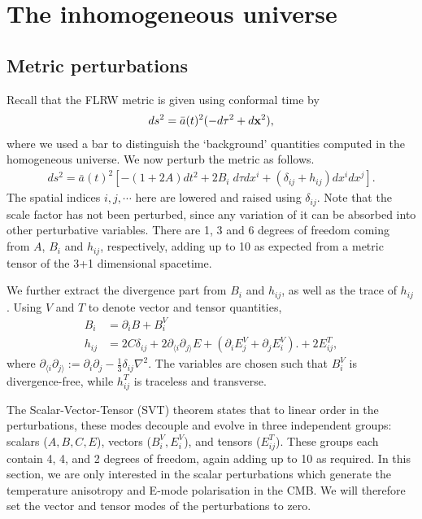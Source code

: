 \section{The inhomogeneous universe} \label{section:the_inhomogeneous_universe}

\subsection{Metric perturbations} \label{section:metric_perturbations}
Recall that the FLRW metric is given using conformal time by
\begin{align}
	ds^2 = \bar{a}(t)^2 (-d\tau^2 + d\mathbf{x}^2),
\end{align}
where we used a bar to distinguish the `background' quantities computed in the homogeneous universe. We now perturb the metric as follows.
\begin{align}
	ds^2 = \bar{a}(t)^2 \left[ -(1+2A) dt^2 + 2B_i \; d\tau dx^i + (\delta_{ij} + h_{ij}) dx^i dx^j \right].
\end{align}
The spatial indices $i,j,\cdots$ here are lowered and raised using $\delta_{ij}$. Note that the scale factor has not been perturbed, since any variation of it can be absorbed into other perturbative variables. There are 1, 3 and 6 degrees of freedom coming from $A$, $B_i$ and $h_{ij}$, respectively, adding up to 10 as expected from a metric tensor of the 3+1 dimensional spacetime.

We further extract the divergence part from $B_i$ and $h_{ij}$, as well as the trace of $h_{ij}$. Using $V$ and $T$ to denote vector and tensor quantities, 
\begin{align}
	B_i &= \partial_i B + B_i^V \\
	h_{ij} &= 2C \delta_{ij} + 2\partial_{\langle i}\partial_{j \rangle} E + (\partial_i E_j^V + \partial_j E_i^V). + 2E^T_{ij},
\end{align}
where $\partial_{\langle i}\partial_{j \rangle} := \partial_i \partial_j - \frac{1}{3} \delta_{ij} \nabla^2$.
The variables are chosen such that $B_i^V$ is divergence-free, while $h_{ij}^T$ is traceless and transverse.

The Scalar-Vector-Tensor (SVT) theorem states that to linear order in the perturbations, these modes decouple and evolve in three independent groups: scalars ($A,B,C,E$), vectors ($B_i^V,E_i^V$), and tensors ($E_{ij}^T$). These groups each contain 4, 4, and 2 degrees of freedom, again adding up to 10 as required. In this section, we are only interested in the scalar perturbations which generate the temperature anisotropy and E-mode polarisation in the CMB. We will therefore set the vector and tensor modes of the perturbations to zero.

